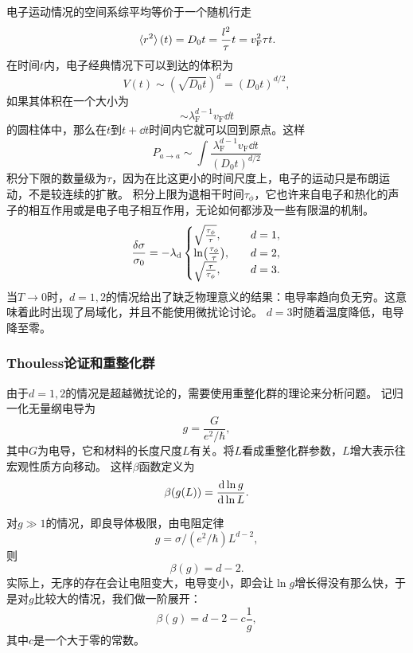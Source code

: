 电子运动情况的空间系综平均等价于一个随机行走
\[
    \expval*{r^2}(t) = D_0 t = \frac{l^2}{\tau} t = v_\text{F}^2 \tau t.
\]
在时间$t$内，电子经典情况下可以到达的体积为
\[
    V(t) \sim (\sqrt{D_0 t})^d = (D_0 t)^{d/2},
\]
如果其体积在一个大小为
\[
    \sim \lambda_\text{F}^{d-1} v_\text{F} \dd{t}
\]
的圆柱体中，那么在$t$到$t+\dd{t}$时间内它就可以回到原点。这样
\[
    P_{a \to a} \sim \int \frac{\lambda_\text{F}^{d-1} v_\text{F} \dd{t}}{(D_0 t)^{d/2}} 
\]
积分下限的数量级为$\tau$，因为在比这更小的时间尺度上，电子的运动只是布朗运动，不是较连续的扩散。
积分上限为退相干时间$\tau_\phi$，它也许来自电子和热化的声子的相互作用或是电子电子相互作用，无论如何都涉及一些有限温的机制。
\[
    \frac{\var{\sigma}}{\sigma_0} = - \lambda_\text{d} \begin{cases}
        \sqrt{\frac{\tau_\phi}{\tau}}, \quad &d = 1, \\
        \ln(\frac{\tau_\phi}{\tau}) , \quad &d = 2, \\
        \sqrt{\frac{\tau}{\tau_\phi}} , \quad &d = 3.
    \end{cases}
\]
当$T\to 0$时，$d=1, 2$的情况给出了缺乏物理意义的结果：电导率趋向负无穷。这意味着此时出现了局域化，并且不能使用微扰论讨论。
$d=3$时随着温度降低，电导降至零。

\subsubsection{Thouless论证和重整化群}

由于$d=1, 2$的情况是超越微扰论的，需要使用重整化群的理论来分析问题。
记归一化无量纲电导为
\begin{equation}
    g = \frac{G}{e^2 / \hbar},
\end{equation}
其中$G$为电导，它和材料的长度尺度$L$有关。将$L$看成重整化群参数，$L$增大表示往宏观性质方向移动。
这样$\beta$函数定义为
\begin{equation}
    \beta(g(L)) = \dv{\ln g}{\ln L}.    
\end{equation}

对$g \gg 1$的情况，即良导体极限，由电阻定律
\[
    g = \sigma / (e^2 / \hbar) L^{d-2},
\]
则
\[
    \beta(g) = d - 2.
\]
实际上，无序的存在会让电阻变大，电导变小，即会让$\ln g$增长得没有那么快，于是对$g$比较大的情况，我们做一阶展开：
\begin{equation}
    \beta(g) = d - 2 - c \frac{1}{g},
    \label{eq:disorder-rg-large-g}
\end{equation}
其中$c$是一个大于零的常数。

